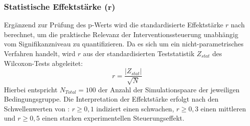 \subsubsection{Statistische Effektstärke ($\boldsymbol{r}$)}
Ergänzend zur Prüfung des p-Werts wird die standardisierte Effektstärke $r$ nach \cite{cohen1988statistical} berechnet, um die praktische Relevanz der Interventionssteuerung unabhängig vom Signifikanzniveau zu quantifizieren. Da es sich um ein nicht-parametrisches Verfahren handelt, wird $r$ aus der standardisierten Teststatistik $Z_{stat}$ des Wilcoxon-Tests abgeleitet:
\begin{equation}
    r = \frac{|Z_{stat}|}{\sqrt{N}}
\end{equation}
Hierbei entspricht $N_{Total} = 100$ der Anzahl der Simulationspaare der jeweiligen Bedingungsgruppe. Die Interpretation der Effektstärke erfolgt nach den Schwellenwerten von \cite{cohen1988statistical}: $r \ge 0{,}1$ indiziert einen schwachen, $r \ge 0{,}3$ einen mittleren und $r \ge 0{,}5$ einen starken experimentellen Steuerungseffekt.
